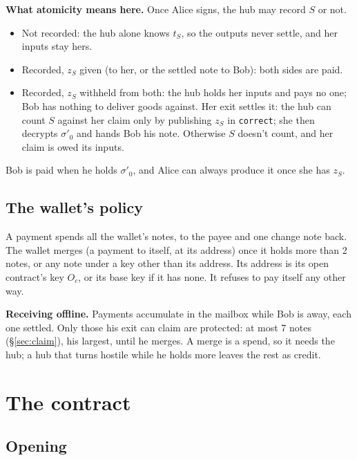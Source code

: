 \documentclass[11pt]{article}
\theoremstyle{plain}
\theoremstyle{definition}
\newcommand{\tx}[1]{\texttt{#1}}
\newcommand{\Oc}{O_c}
\begin{document}
\textbf{What atomicity means here.} Once Alice signs, the hub may record
$S$ or not.
\begin{itemize}[nosep]
\item Not recorded: the hub alone knows $t_S$, so the outputs never
  settle, and her inputs stay hers.
\item Recorded, $z_S$ given (to her, or the settled note to Bob): both
  sides are paid.
\item Recorded, $z_S$ withheld from both: the hub holds her inputs and
  pays no one; Bob has nothing to deliver goods against. Her exit
  settles it: the hub can count $S$ against her claim only by publishing
  $z_S$ in \tx{correct}; she then decrypts $\sigma'_0$ and hands Bob
  his note. Otherwise $S$ doesn't count, and her claim is owed its
  inputs.
\end{itemize}
Bob is paid when he holds $\sigma'_0$, and Alice can always produce it
once she has $z_S$.

\subsection{The wallet's policy}

A payment spends all the wallet's notes, to the payee and one change
note back. The wallet merges (a payment to itself, at its address) once
it holds more than 2 notes, or any note under a key other than its
address. Its address is its open contract's key $\Oc$, or its base key
if it has none. It refuses to pay itself any other way.

\textbf{Receiving offline.} Payments accumulate in the mailbox while
Bob is away, each one settled. Only those his exit can claim are
protected: at most 7 notes (\S\ref{sec:claim}), his largest, until he
merges. A merge is a spend, so it needs the hub; a hub that turns
hostile while he holds more leaves the rest as credit.

\section{The contract}

\subsection{Opening}\label{sec:opening}
\end{document}
